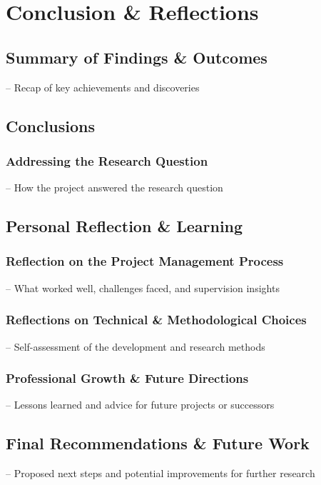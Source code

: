 \section{Conclusion \& Reflections}

\subsection{Summary of Findings \& Outcomes}
– Recap of key achievements and discoveries
\subsection{Conclusions}
\subsubsection{Addressing the Research Question}
– How the project answered the research question
\subsection{Personal Reflection \& Learning}
\subsubsection{Reflection on the Project Management Process}
– What worked well, challenges faced, and supervision insights
\subsubsection{Reflections on Technical \& Methodological Choices}
– Self-assessment of the development and research methods
\subsubsection{Professional Growth \& Future Directions}
– Lessons learned and advice for future projects or successors
\subsection{Final Recommendations \& Future Work}
– Proposed next steps and potential improvements for further research